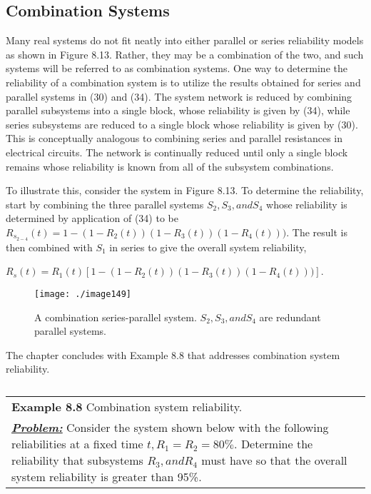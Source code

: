 {\subsection{Combination Systems}
\label{subsection:combination-systems}

Many real systems do not fit neatly into either parallel or series
reliability models as shown in Figure 8.13. Rather, they may be a
combination of the two, and such systems will be referred to as
combination systems. One way to determine the reliability of a
combination system is to utilize the results obtained for series and
parallel systems in (30) and (34). The system network is reduced by
combining parallel subsystems into a single block, whose reliability is
given by (34), while series subsystems are reduced to a single block
whose reliability is given by (30). This is conceptually analogous to
combining series and parallel resistances in electrical circuits. The
network is continually reduced until only a single block remains whose
reliability is known from all of the subsystem combinations.

To illustrate this, consider the system in Figure 8.13. To determine the
reliability, start by combining the three parallel systems
$S_2, S_3, and S_4$ whose
reliability is determined by application of (34) to be 
$R_{s_{2-4}}(t) = 1- (1-R_2(t))(1-R_3(t))(1-R_4(t)))$.
The result is then combined with $S_1$ in series to give the
overall system reliability, 

$R_{s}(t) = R_1(t) \left[ 1- (1-R_2(t))(1-R_3(t))(1-R_4(t))) \right]$.


\begin{figure}
\texttt{[image: ./image149]}
\caption{A combination series-parallel system. $S_2, S_3, and S_4$
are redundant parallel systems.}
\label{figure:}
\end{figure}


The chapter concludes with Example 8.8 that addresses combination system
reliability.


\begin{table}
\caption{}
\label{table:<context>}
\begin{tabular}{m{15cm}|}
\textbf{Example 8.8} 
Combination system reliability. \\

\emph{\textbf{\ul{Problem:}}} Consider the system shown below with the
following reliabilities at a fixed time $t, R_1=R_2= 80\%$. 
Determine the reliability that subsystems $R_3, and R_4$
must have so that the overall system reliability is greater than 95\%.


\end{tabular}
\end{table}}
